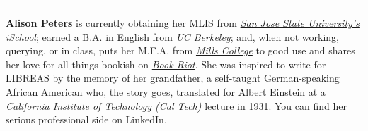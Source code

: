 \begin{center}\rule{0.5\linewidth}{\linethickness}\end{center}

\textbf{Alison Peters} is currently obtaining her MLIS from
\href{http://ischool.sjsu.edu/}{\emph{San Jose State University's
iSchool}}; earned a B.A. in English from
\href{http://berkeley.edu/}{\emph{UC Berkeley}}; and, when not working,
querying, or in class, puts her M.F.A. from
\href{http://www.mills.edu/}{\emph{Mills College}} to good use and
shares her love for all things bookish on
\href{http://bookriot.com/}{\emph{Book Riot}}. She was inspired to write
for LIBREAS by the memory of her grandfather, a self-taught
German-speaking African American who, the story goes, translated for
Albert Einstein at a \href{http://www.caltech.edu/}{\emph{California
Institute of Technology (Cal Tech)}} lecture in 1931. You can find her
serious professional side on LinkedIn. 
